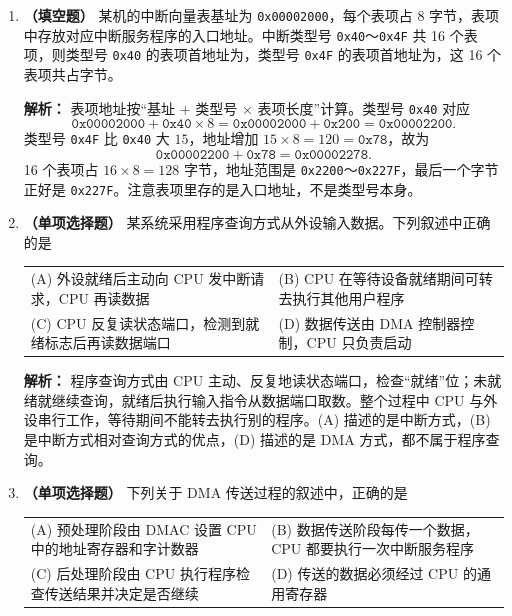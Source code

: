 \begin{enumerate}
\item \textbf{（填空题）} 某机的中断向量表基址为 \texttt{0x00002000}，每个表项占 8 字节，表项中存放对应中断服务程序的入口地址。中断类型号 \texttt{0x40}～\texttt{0x4F} 共 16 个表项，则类型号 \texttt{0x40} 的表项首地址为\underline{\qquad\qquad}，类型号 \texttt{0x4F} 的表项首地址为\underline{\qquad\qquad}，这 16 个表项共占\underline{\qquad\qquad}字节。

\ifshowsolutions\par\noindent\textbf{解析：} 表项地址按“基址 $+$ 类型号 $\times$ 表项长度”计算。类型号 \texttt{0x40} 对应
\[
\texttt{0x00002000}+\texttt{0x40}\times 8
=\texttt{0x00002000}+\texttt{0x200}
=\texttt{0x00002200}.
\]
类型号 \texttt{0x4F} 比 \texttt{0x40} 大 $15$，地址增加 $15\times 8=120=\texttt{0x78}$，故为
\[
\texttt{0x00002200}+\texttt{0x78}=\texttt{0x00002278}.
\]
16 个表项占 $16\times8=128$ 字节，地址范围是 \texttt{0x2200}～\texttt{0x227F}，最后一个字节正好是 \texttt{0x227F}。注意表项里存的是入口地址，不是类型号本身。\else \answerarea \fi

\item \textbf{（单项选择题）} 某系统采用程序查询方式从外设输入数据。下列叙述中正确的是
\begin{center}
\begin{tabularx}{0.96\linewidth}{@{}X X@{}}
(A) 外设就绪后主动向 CPU 发中断请求，CPU 再读数据 & (B) CPU 在等待设备就绪期间可转去执行其他用户程序 \\[4pt]
(C) CPU 反复读状态端口，检测到就绪标志后再读数据端口 & (D) 数据传送由 DMA 控制器控制，CPU 只负责启动
\end{tabularx}
\end{center}

\ifshowsolutions\par\noindent\textbf{解析：} 程序查询方式由 CPU 主动、反复地读状态端口，检查“就绪”位；未就绪就继续查询，就绪后执行输入指令从数据端口取数。整个过程中 CPU 与外设串行工作，等待期间不能转去执行别的程序。(A) 描述的是中断方式，(B) 是中断方式相对查询方式的优点，(D) 描述的是 DMA 方式，都不属于程序查询。\else \answerarea \fi

\item \textbf{（单项选择题）} 下列关于 DMA 传送过程的叙述中，正确的是
\begin{center}
\begin{tabularx}{0.96\linewidth}{@{}X X@{}}
(A) 预处理阶段由 DMAC 设置 CPU 中的地址寄存器和字计数器 & (B) 数据传送阶段每传一个数据，CPU 都要执行一次中断服务程序 \\[4pt]
(C) 后处理阶段由 CPU 执行程序检查传送结果并决定是否继续 & (D) 传送的数据必须经过 CPU 的通用寄存器
\end{tabularx}
\end{center}


\end{enumerate}
